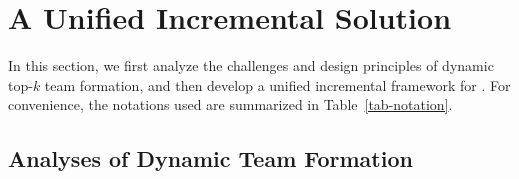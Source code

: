 \newcommand{\changedinc}{\kw{Changed}}
\newcommand{\cut}{\kw{CUT}}
\newcommand{\imr}{\kw{IMR}}
\newcommand{\imrs}{\kw{IMRs}}
\newcommand{\fb}{\kw{FBM}}
\newcommand{\bs}{\kw{BS}}
\newcommand{\fs}{\kw{FS}}
\newcommand{\bfc}{\kw{BF}}
\newcommand{\upl}{\kw{UP}}
\newcommand{\fbmatstruct}{\kw{FBMatStruct}}
\newcommand{\matchindex}{\kw{MatStaIndex}}
\newcommand{\matchimr}{\kw{MatchIMR}}
\newcommand{\for}{\kw{FOR}}
\newcommand{\while}{\kw{WHIlE}}
\newcommand{\allmatch}{\kw{mat}}
\newcommand{\affnode}{\kw{affnode}}

\newcommand{\ms}{\kw{SHOUDfs}}
\newcommand{\ballfilter}{\kw{SHOUDbfc}}

\newcommand{\dens}{\kw{den}}
\newcommand{\identifyaffball}{\kw{IdABall}}
\newcommand{\patedgeinsert}{\kw{patEIns}}
\newcommand{\incmatch}{\kw{IncMatch}}
\newcommand{\wmatchindex}{\kw{wMatStaCode}}
\newcommand{\cflag}{\kw{cflag}}
\newcommand{\dflag}{\kw{dflag}}
\newcommand{\gflag}{\kw{gflag}}
\newcommand{\rflag}{\kw{rflag}}

\newcommand{\incgrpat}{\kw{kPatIncGPM}}
\newcommand{\incgrdata}{\kw{kDataIncGPM}}
\newcommand{\dyngr}{\kw{kDynGPM}}
\newcommand{\affballx}{\kw{AffB}}
\newcommand{\affballsx}{\kw{AffBs}}
\newcommand{\affballacc}{\kw{AffBall^{acc}}}
\newcommand{\affballaccs}{\kw{AffBalls^{acc}}}
\newcommand{\affballimr}{\kw{AffBall^{imr}}}
\newcommand{\affballimrs}{\kw{AffBalls^{imr}}}
\newcommand{\patinc}{\kw{dynamicPG}}
\newcommand{\datainc}{\kw{dynamicDG}}
\newcommand{\optpatinc}{\kw{SHOULDoptinc}}
\newcommand{\inc}{\kw{dynamic}}
\newcommand{\matchs}{\kw{R}}
\newcommand{\comb}{\kw{combine}}
\newcommand{\optinc}{\kw{optDynamic}}

\newcommand{\incp}{\kw{dynamicP}}
\newcommand{\incd}{\kw{dynamicG}}


\section{A Unified Incremental Solution}
\label{sec-dynamictopk}

In this section, we first analyze the challenges and design principles of dynamic top-$k$ team formation,
and then develop a unified incremental framework for \dynteamF.
For convenience, the notations used are summarized in Table~\ref{tab-notation}.


\subsection{Analyses of Dynamic Team Formation}


